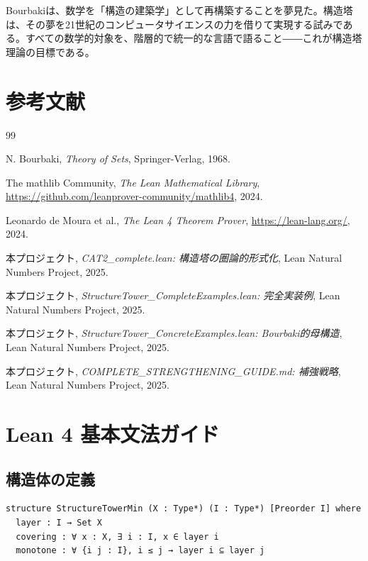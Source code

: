 \documentclass[a4paper,11pt]{ltjsarticle}
\begin{document}
\begin{remarkbox}[title=Bourbakiの夢]
Bourbakiは、数学を「構造の建築学」として再構築することを夢見た。構造塔は、その夢を21世紀のコンピュータサイエンスの力を借りて実現する試みである。すべての数学的対象を、階層的で統一的な言語で語ること――これが構造塔理論の目標である。
\end{remarkbox}

\newpage

\section*{参考文献}

\begin{thebibliography}{99}

N. Bourbaki, \textit{Theory of Sets}, Springer-Verlag, 1968.

The mathlib Community, \textit{The Lean Mathematical Library},
\url{https://github.com/leanprover-community/mathlib4}, 2024.

Leonardo de Moura et al., \textit{The Lean 4 Theorem Prover},
\url{https://lean-lang.org/}, 2024.

本プロジェクト, \textit{CAT2\_complete.lean: 構造塔の圏論的形式化},
Lean Natural Numbers Project, 2025.

本プロジェクト, \textit{StructureTower\_CompleteExamples.lean: 完全実装例},
Lean Natural Numbers Project, 2025.

本プロジェクト, \textit{StructureTower\_ConcreteExamples.lean: Bourbaki的母構造},
Lean Natural Numbers Project, 2025.

本プロジェクト, \textit{COMPLETE\_STRENGTHENING\_GUIDE.md: 補強戦略},
Lean Natural Numbers Project, 2025.

\end{thebibliography}

\newpage

\appendix

\section{Lean 4 基本文法ガイド}

\subsection{構造体の定義}

\begin{lstlisting}[style=leanstyle]
structure StructureTowerMin (X : Type*) (I : Type*) [Preorder I] where
  layer : I → Set X
  covering : ∀ x : X, ∃ i : I, x ∈ layer i
  monotone : ∀ {i j : I}, i ≤ j → layer i ⊆ layer j
\end{lstlisting}
\end{document}

